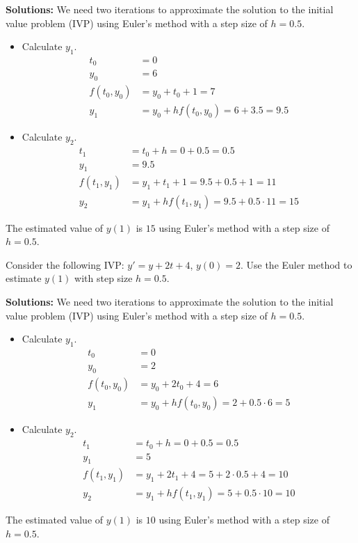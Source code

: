 \ifnum {} {\color{DarkBlue} 
\textbf{Solutions:} We need two iterations to approximate the solution to the initial value problem (IVP) using Euler's method with a step size of \( h = 0.5 \).

\begin{itemize}
    \item Calculate $y_1$. 
        \begin{align}
            t_0 &= 0 \\
            y_0 &= 6 \\
            f(t_0, y_0) &= y_0 + t_0 + 1 = 7 \\
            y_1 &= y_0 + h f(t_0, y_0) = 6 +3.5 = 9.5
        \end{align}
            
    \item Calculate \( y_2 \).
        \begin{align}
            t_1 &= t_0 + h = 0 + 0.5 = 0.5 \\
            y_1 &= 9.5 \\
            f(t_1, y_1) &= y_1 + t_1 + 1 = 9.5 + 0.5 + 1 = 11 \\
          y_2 &= y_1 + h f(t_1, y_1) = 9.5 + 0.5 \cdot 11 = 15
        \end{align} 
\end{itemize}

The estimated value of \( y(1) \) is \( 15 \) using Euler's method with a step size of \( h = 0.5 \).
} 
\else 
\newpage
\fi
\fi 


\ifnum {}
\question[2] Consider the following IVP: $y' = y + 2t+4$, $y(0) = 2$. Use the Euler method to estimate $y(1)$ with step size $h=0.5$.

\ifnum {} {\color{DarkBlue} 
\textbf{Solutions:} We need two iterations to approximate the solution to the initial value problem (IVP) using Euler's method with a step size of \( h = 0.5 \).

\begin{itemize}
    \item Calculate $y_1$. 
        \begin{align}
            t_0 &= 0 \\
            y_0 &= 2 \\
            f(t_0, y_0) &= y_0 + 2t_0 + 4 = 6 \\
            y_1 &= y_0 + h f(t_0, y_0) = 2 + 0.5 \cdot 6 = 5
        \end{align}
            
    \item Calculate \( y_2 \).
        \begin{align}
            t_1 &= t_0 + h = 0 + 0.5 = 0.5 \\
            y_1 &= 5 \\
            f(t_1, y_1) &= y_1 + 2 t_1 + 4 = 5 + 2\cdot 0.5 + 4 = 10 \\
          y_2 &= y_1 + h f(t_1, y_1) = 5 + 0.5 \cdot 10 = 10
        \end{align} 
\end{itemize}

The estimated value of \( y(1) \) is \( 10 \) using Euler's method with a step size of \( h = 0.5 \).
} 
\else 
\newpage
\fi
\fi 